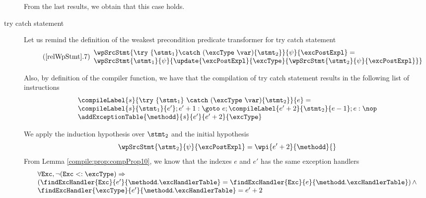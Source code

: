 \begin{description}
From the last results, we obtain that this case holds.



  \item[try catch statement] 
	   Let us remind the definition of the weakest precondition predicate transformer for try catch statement %
	   \begin{equation*} \label{pog18}    \tag{\ref{relWpStmt}.7}  
                             \begin{array}{l} \wpSrcStmt{    \try \ \{ \stmt_1 \} 
		                                              \catch \ (\excType \ \var )\{ \stmt_2 \} 
                                                }{\psi}{\excPostExpl} =\\ 
	    \wpSrcStmt{\stmt_1 }{  \psi} {  \update{\excPostExpl}{\excType}{ \wpSrcStmt{\stmt_2 }{\psi}{\excPostExpl }} }  
	    \end{array}            
\end{equation*}
	    
	        
              Also, by definition of the compiler function, we have that the compilation of try catch statement results in the following
              list of instructions %
	      \begin{equation*}	 \begin{array}{l}  \compileLabel{s}{ \try \ \{ \stmt_1 \} \ \catch \ (\excType \ \var )\{ \stmt_2 \} }{e} = \\
                      \compileLabel{s}{\stmt_1}{e'};   e' + 1: \goto \ e;  \compileLabel{e' + 2 }{\stmt_2}{e - 1}; e: \nop\\
		                           
			\addExceptionTable{\methodd}{ s }{ e'  }{ e' + 2 }{\excType}  \end{array} 
              \end{equation*}

              We apply the induction hypothesis over $\stmt_2$ and the initial hypothesis 
               \begin{equation*}  \wpSrcStmt{\stmt_2}{\psi}{\excPostExpl} = \wpi{e'+2}{\methodd}{} \end{equation*}
	       From Lemma \ref{compile:prop:compProp10},  we know that the indexes $e$ and $e'$ has the same exception handlers~
	       \begin{equation*} 
                      \begin{array}{l} \forall \mbox{\rm{\texttt{Exc}}},  \neg ( \mbox{\rm{\texttt{Exc}}} <: \excType ) \Rightarrow\\
	                 \left(\findExcHandler{\mbox{\rm\tt{Exc}} }{e'}{\methodd.\excHandlerTable} = 
		         \findExcHandler{\mbox{\rm\tt{Exc}} }{e}{\methodd.\excHandlerTable} \right) 
		         \wedge\\
		         \findExcHandler{\excType }{e'}{\methodd.\excHandlerTable} = e'+2
                      \end{array}  
	        \end{equation*} 
	      

\end{description}
